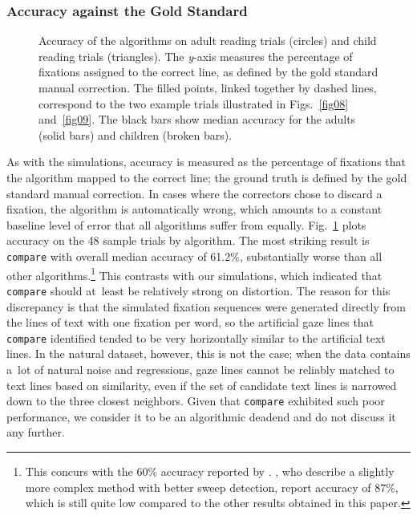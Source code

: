 \documentclass[doc,biblatex]{apa7}
\begin{document}
\subsubsection{Accuracy against the Gold Standard}

	\begin{figure}
	\vspace*{2pt}
	\caption{Accuracy of the algorithms on adult reading trials (circles) and child reading trials (triangles). The \textit{y}-axis measures the percentage of fixations assigned to the correct line, as defined by the gold standard manual correction. The filled points, linked together by dashed lines, correspond to the two example trials illustrated in Figs.~\ref{fig08} and~\ref{fig09}. The black bars show median accuracy for the adults (solid bars) and children (broken bars).}
	\label{fig07}
	\end{figure}

As with the simulations, accuracy is measured as the percentage of fixations that the algorithm mapped to the correct line; the ground truth is defined by the gold standard manual correction. In cases where the correctors chose to discard a fixation, the algorithm is automatically wrong, which amounts to a constant baseline level of error that all algorithms suffer from equally. Fig.~\ref{fig07} plots accuracy on the 48 sample trials by algorithm. The most striking result is \texttt{compare} with overall median accuracy of 61.2\%, substantially worse than all other algorithms.\footnote{This concurs with the 60\% accuracy reported by \textcite[p.~1231]{LimaSanches:2015}. \textcite[p.~104]{Yamaya:2017}, who describe a slightly more complex method with better sweep detection, report accuracy of 87\%, which is still quite low compared to the other results obtained in this paper.} This contrasts with our simulations, which indicated that \texttt{compare} should at~least be relatively strong on distortion. The reason for this discrepancy is that the simulated fixation sequences were generated directly from the lines of text with one fixation per word, so the artificial gaze lines that \texttt{compare} identified tended to be very horizontally similar to the artificial text lines. In the natural dataset, however, this is not the case; when the data contains a~lot of natural noise and regressions, gaze lines cannot be reliably matched to text lines based on similarity, even if the set of candidate text lines is narrowed down to the three closest neighbors. Given that \texttt{compare} exhibited such poor performance, we consider it to be an algorithmic deadend and do not discuss it any further.
\end{document}
